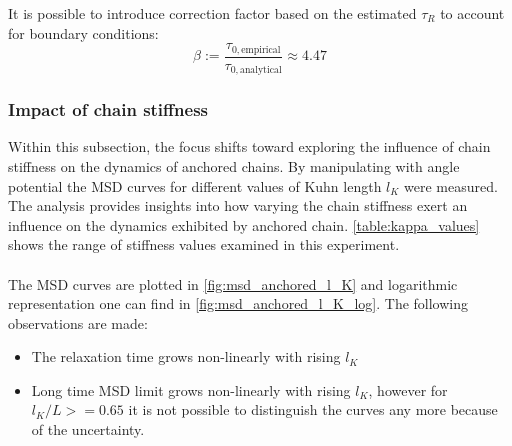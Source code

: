 \documentclass[
    paper=A4,pagesize=automedia,fontsize=12pt,
    BCOR=15mm,DIV=22,
    twoside,headinclude,footinclude=false,
    fleqn,             %
    bibliography=totocnumbered,          %
    listof=totoc,                %
    listof=flat,                 %
    cleardoublepage=empty      %
    numbers=endperiod
]{scrartcl}
\begin{document}
It is possible to introduce correction factor based on the estimated $\tau_R$
to account for boundary conditions:
\begin{equation}
    \label{eq:adj_factor_beta}
    \beta := \frac{\tau_{0, \textrm{empirical}}}{\tau_{0, \textrm{analytical}}} \approx 4.47
\end{equation}

\FloatBarrier


\subsubsection{Impact of chain stiffness} \label{sec:impact_of_chain_stiffness}
Within this subsection, the focus shifts 
toward exploring the influence of chain stiffness on
the dynamics of anchored chains. 
By manipulating with angle potential the MSD curves for different values
of Kuhn length $l_K$ were measured. 
The analysis provides insights into 
how varying the chain stiffness exert an influence on the 
dynamics exhibited by anchored chain.
\autoref{table:kappa_values} shows the range of stiffness values examined
in this experiment.
\\
\\
The MSD curves are plotted in \autoref{fig:msd_anchored_l_K} and logarithmic
representation one can find in \autoref{fig:msd_anchored_l_K_log}.
The following observations are made:
\begin{itemize}
    \item The relaxation time grows non-linearly with rising $l_K$
    \item Long time MSD limit grows non-linearly with rising $l_K$,
    however for $l_K/L >= 0.65$ it is not possible to distinguish 
    the curves any more because of the uncertainty.
\end{itemize}
\end{document}
